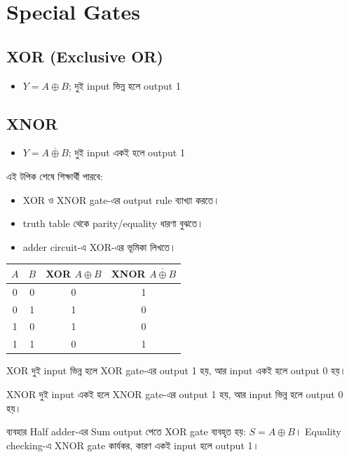 \section{Special Gates}

\subsection{XOR (Exclusive OR)}
\begin{itemize}
\item $Y=A\oplus B$; দুই input ভিন্ন হলে output 1
\end{itemize}

\subsection{XNOR}
\begin{itemize}
\item $Y=\overline{A\oplus B}$; দুই input একই হলে output 1
\end{itemize}

\begin{learningbox}
এই টপিক শেষে শিক্ষার্থী পারবে:
\begin{itemize}
\item XOR ও XNOR gate-এর output rule ব্যাখ্যা করতে।
\item truth table থেকে parity/equality ধারণা বুঝতে।
\item adder circuit-এ XOR-এর ভূমিকা লিখতে।
\end{itemize}
\end{learningbox}

\begin{center}
\begin{tabular}{|c|c|c|c|}
\hline
$A$ & $B$ & XOR $A\oplus B$ & XNOR $\overline{A\oplus B}$ \\
\hline
0 & 0 & 0 & 1 \\
\hline
0 & 1 & 1 & 0 \\
\hline
1 & 0 & 1 & 0 \\
\hline
1 & 1 & 0 & 1 \\
\hline
\end{tabular}
\end{center}

\begin{definitionbox}{XOR}
দুই input ভিন্ন হলে XOR gate-এর output 1 হয়, আর input একই হলে output 0 হয়।
\end{definitionbox}

\begin{definitionbox}{XNOR}
দুই input একই হলে XNOR gate-এর output 1 হয়, আর input ভিন্ন হলে output 0 হয়।
\end{definitionbox}

\begin{examplebox}{ব্যবহার}
Half adder-এর Sum output পেতে XOR gate ব্যবহৃত হয়: $S=A\oplus B$। Equality checking-এ XNOR gate কার্যকর, কারণ একই input হলে output 1।
\end{examplebox}
